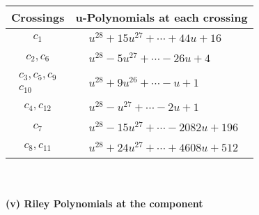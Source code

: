 \documentclass[1p]{elsarticle_modified}
\theoremstyle{definition}
\begin{document}
\begin{tabular}{m{50pt}|m{274pt}}
Crossings & \hspace{64pt}u-Polynomials at each crossing \\
\hline $$\begin{aligned}c_{1}\end{aligned}$$&$\begin{aligned}
&u^{28}+15 u^{27}+\cdots+44 u+16
\end{aligned}$\\
\hline $$\begin{aligned}c_{2},c_{6}\end{aligned}$$&$\begin{aligned}
&u^{28}-5 u^{27}+\cdots-26 u+4
\end{aligned}$\\
\hline $$\begin{aligned}c_{3},c_{5},c_{9}\\c_{10}\end{aligned}$$&$\begin{aligned}
&u^{28}+9 u^{26}+\cdots- u+1
\end{aligned}$\\
\hline $$\begin{aligned}c_{4},c_{12}\end{aligned}$$&$\begin{aligned}
&u^{28}- u^{27}+\cdots-2 u+1
\end{aligned}$\\
\hline $$\begin{aligned}c_{7}\end{aligned}$$&$\begin{aligned}
&u^{28}-15 u^{27}+\cdots-2082 u+196
\end{aligned}$\\
\hline $$\begin{aligned}c_{8},c_{11}\end{aligned}$$&$\begin{aligned}
&u^{28}+24 u^{27}+\cdots+4608 u+512
\end{aligned}$\\
\hline
\end{tabular}\\~\\
\newpage\renewcommand{\arraystretch}{1}
\flushleft \textbf{(v) Riley Polynomials at the component}\newline \\
\end{document}
